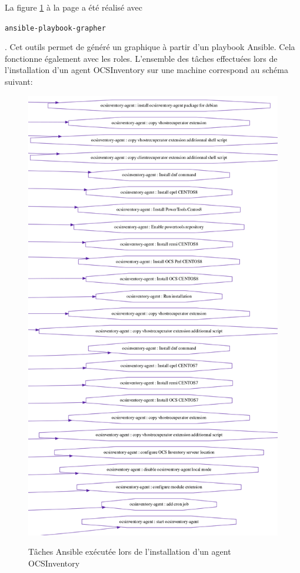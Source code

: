 \documentclass[12pt]{article}
\begin{document}
La figure \ref{fig:graph_roles_ocs.png} à la page \pageref{fig:graph_roles_ocs.png} a été réalisé avec \begin{code}\texttt{ansible-playbook-grapher}\end{code}.
Cet outils permet de généré un graphique à partir d'un playbook \gls{Ansible}.
Cela fonctionne également avec les roles.
L'ensemble des tâches effectuées lors de l'installation d'un agent \gls{OCSInventory} sur une machine correspond au schéma suivant:
\begin{figure}[!ht]
    \centering
    \includegraphics[scale=0.43]{src/graph_roles_ocs.png}
    \label{fig:graph_roles_ocs.png}
    \caption{Tâches \gls{Ansible} exécutée lors de l'installation d'un agent \gls{OCSInventory}}
\end{figure}
\end{document}
